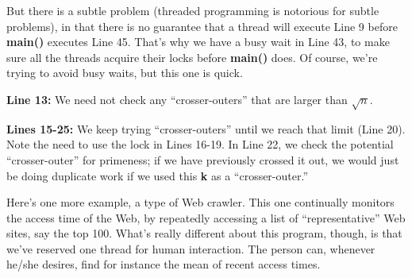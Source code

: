 But there is a subtle problem (threaded programming is notorious for
subtle problems), in that there is no guarantee that a thread will
execute Line 9 before {\bf main()} executes Line 45.  That's why we have
a busy wait in Line 43, to make sure all the threads acquire their locks
before {\bf main()} does.  Of course, we're trying to avoid busy waits,
but this one is quick.

{\bf Line 13:}  We need not check any ``crosser-outers'' that are larger
than $\sqrt{n}$.  

{\bf Lines 15-25:}  We keep trying ``crosser-outers'' until we reach
that limit (Line 20).  Note the need to use the lock in Lines 16-19.
In Line 22, we check the potential ``crosser-outer'' for primeness; if
we have previously crossed it out, we would just be doing duplicate work
if we used this {\bf k} as a ``crosser-outer.''

Here's one more example, a type of Web crawler.  This one continually
monitors the access time of the Web, by repeatedly accessing a list of
``representative'' Web sites, say the top 100.  What's really different
about this program, though, is that we've reserved one thread for human
interaction.  The person can, whenever he/she desires, find for instance
the mean of recent access times.

